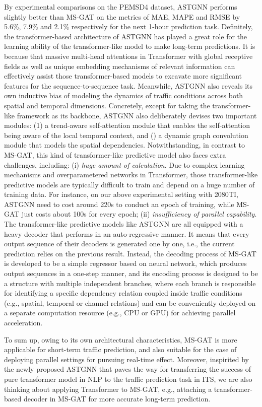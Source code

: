 By experimental comparisons on the PEMSD4 dataset, ASTGNN performs slightly better than MS-GAT on the metrics of MAE, MAPE and RMSE by 5.6\%, 7.9\% and 2.1\% respectively for the next 1-hour prediction task. Definitely, the transformer-based architecture of ASTGNN has played a great role for the learning ability of the transformer-like model to make long-term predictions. It is because that massive multi-head attentions in Transformer with global receptive fields as well as unique embedding mechanisms of relevant information can effectively assist those transformer-based models to excavate more significant features for the sequence-to-sequence task. Meanwhile, ASTGNN also reveals its own inductive bias of modeling the dynamics of traffic conditions across both spatial and temporal dimensions. Concretely, except for taking the transformer-like framework as its backbone, ASTGNN also deliberately devises two important modules: (1) a trend-aware self-attention module that enables the self-attention being aware of the local temporal context, and () a dynamic graph convolution module that models the spatial dependencies. Notwithstanding, in contrast to MS-GAT, this kind of transformer-like predictive model also faces extra challenges, including: (i) \textit{huge amount of calculation}. Due to complex learning mechanisms and overparametered networks in Transformer, those transformer-like predictive models are typically difficult to train and depend on a huge number of training data. For instance, on our above experimental setting with 2080TI, ASTGNN need to cost around 220s to conduct an epoch of training, while MS-GAT just costs about 100s for every epoch; (ii) \textit{insufficiency of parallel capability}. The transformer-like predictive models like ASTGNN are all equipped with a heavy decoder that performs in an auto-regressive manner. It means that every output sequence of their decoders is generated one by one, i.e., the current prediction relies on the previous result. Instead, the decoding process of MS-GAT is developed to be a simple regressor based on neural network, which produces output sequences in a one-step manner, and its encoding process is designed to be a structure with multiple independent branches, where each branch is responsible for identifying a specific dependency relation coupled inside traffic conditions (e.g., spatial, temporal or channel relations) and can be conveniently deployed on a separate computation resource (e.g., CPU or GPU) for achieving parallel acceleration. 

To sum up, owing to its own architectural characteristics, MS-GAT is more applicable for short-term traffic prediction, and also suitable for the case of deploying parallel settings for pursuing real-time effect. Moreover, inspirited by the newly proposed ASTGNN that paves the way for transferring the success of pure transformer model in NLP to the traffic prediction task in ITS, we are also thinking about applying Transformer to MS-GAT, e.g., attaching a transformer-based decoder in MS-GAT for more accurate long-term prediction. 
